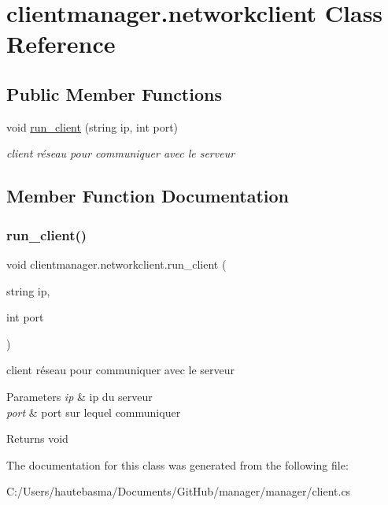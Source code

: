 \hypertarget{classclientmanager_1_1networkclient}{}\section{clientmanager.\+networkclient Class Reference}
\label{classclientmanager_1_1networkclient}
\subsection*{Public Member Functions}
\begin{DoxyCompactItemize}
\item 
void \hyperlink{classclientmanager_1_1networkclient_a1ce8f44d48effe352e12ab814610611f}{run\+\_\+client} (string ip, int port)
\begin{DoxyCompactList}\small\item\em client réseau pour communiquer avec le serveur \end{DoxyCompactList}\end{DoxyCompactItemize}


\subsection{Member Function Documentation}
\mbox{\label{classclientmanager_1_1networkclient_a1ce8f44d48effe352e12ab814610611f}} 
\subsubsection{\texorpdfstring{run\+\_\+client()}{run\_client()}}
{\footnotesize\ttfamily void clientmanager.\+networkclient.\+run\+\_\+client (\begin{DoxyParamCaption}\item[{string}]{ip,  }\item[{int}]{port }\end{DoxyParamCaption})}



client réseau pour communiquer avec le serveur 


\begin{DoxyParams}{Parameters}
{\em ip} & ip du serveur\\
\hline
{\em port} & port sur lequel communiquer\\
\hline
\end{DoxyParams}
\begin{DoxyReturn}{Returns}
void
\end{DoxyReturn}


The documentation for this class was generated from the following file\+:\begin{DoxyCompactItemize}
\item 
C\+:/\+Users/hautebasma/\+Documents/\+Git\+Hub/manager/manager/client.\+cs\end{DoxyCompactItemize}
